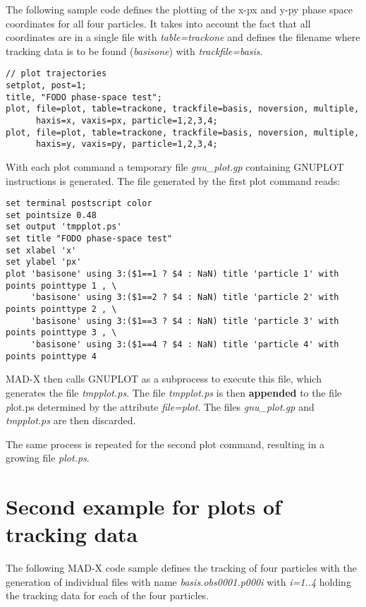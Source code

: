 The following sample code defines the plotting of the x-px and y-py
phase space coordinates for all four particles. 
It takes into account the fact that all coordinates are in a single file 
with \textit{table=trackone} and defines the filename where tracking data 
is to be found (\textit{basisone}) with \textit{trackfile=basis}. 

\begin{verbatim}
// plot trajectories
setplot, post=1; 
title, "FODO phase-space test";
plot, file=plot, table=trackone, trackfile=basis, noversion, multiple, 
      haxis=x, vaxis=px, particle=1,2,3,4; 
plot, file=plot, table=trackone, trackfile=basis, noversion, multiple, 
      haxis=y, vaxis=py, particle=1,2,3,4;
\end{verbatim}

With each plot command a temporary file \textit{gnu\_plot.gp} containing
GNUPLOT instructions is generated.  
The file generated by the first plot command reads: 

{\footnotesize \begin{verbatim}  
set terminal postscript color
set pointsize 0.48
set output 'tmpplot.ps'
set title "FODO phase-space test"
set xlabel 'x'
set ylabel 'px'
plot 'basisone' using 3:($1==1 ? $4 : NaN) title 'particle 1' with points pointtype 1 , \
     'basisone' using 3:($1==2 ? $4 : NaN) title 'particle 2' with points pointtype 2 , \
     'basisone' using 3:($1==3 ? $4 : NaN) title 'particle 3' with points pointtype 3 , \
     'basisone' using 3:($1==4 ? $4 : NaN) title 'particle 4' with points pointtype 4 
\end{verbatim}}

MAD-X then calls GNUPLOT as a subprocess to execute this file, which
generates the file \textit{tmpplot.ps}.  
The file \textit{tmpplot.ps} is then {\bf appended} to the file 
{\textit plot.ps} determined by the attribute \textit{file=plot}.  
The files \textit{gnu\_plot.gp} and \textit{tmpplot.ps} are then
discarded. 

The same process is repeated for the second plot command, resulting in a
growing file \textit{plot.ps}.


\section{Second example for plots of tracking data}

The following MAD-X code sample defines the tracking of four particles 
with the generation of individual files with name
\textit{basis.obs0001.p000i} with \textit{i=1..4}  
holding the tracking data for each of the four particles.  

